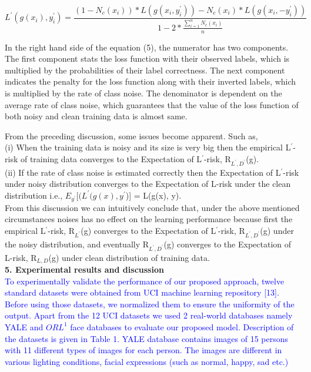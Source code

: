 \documentclass{article}
\begin{document}
		\begin{equation} \label{$eq:(1)$}
			L^{\prime}(g(x_i), y_i^{\prime}) = \frac 
			{ (1 - N_c(x_i)) * L(g(x_i, y_i^{\prime})) - N_c(x_i) * L(g(x_i, -y_i^{\prime})) } 
			{ 1-2 * \frac
				{\sum_{i=1}^{n} N_c(x_i)} 
				{n}
			} 
		\end{equation}

		In the right hand side of the equation (5), the numerator has two components. The first component stats
		the loss function with their observed labels, which is multiplied by the probabilities of their label correctness.
		The next component indicates the penalty for the loss function along with their inverted labels, which is multiplied by the rate of class noise. The denominator is dependent on the average rate of class noise, which guarantees that the value of the loss function of both noisy and clean training data is almost same.
		
		\hspace{0.1em}From the preceding discussion, some issues become apparent. Such as,\\
		
		(i) When the training data is noisy and its size is very big then the empirical L$^{\prime}$-risk of training data
		converges to the Expectation of L$^{\prime}$-risk, R$_{L^{\prime},D^{\prime}}$(g). \\
		
		(ii) If the rate of class noise is estimated correctly then the Expectation of L$^{\prime}$-risk under noisy distribution
		converges to the Expectation of L-risk under the clean distribution i.e., $E_{y^{\prime}} [(L^{\prime}(g(x), y^{\prime}$)] = L(g(x), y).\\
		
		\hspace{0.1em}From this discussion we can intuitively conclude that, under the above mentioned circumstances noises has
		no effect on the learning performance because first the empirical L$^{\prime}$-risk, R$_{L^\prime}$(g) converges to the Expectation
		of L$^{\prime}$-risk, R$_{L^{\prime},D^{\prime}}$(g) under the noisy distribution, and eventually R$_{L^{\prime},D^{\prime}}$(g) converges to the Expectation of L-risk, R$_{L,D}$(g) under clean distribution of training data.\\
		
		
		\textbf{5. Experimental results and discussion}\\
		
		
		\textcolor{blue}{To experimentally validate the performance of our proposed approach, twelve standard datasets were obtained from UCI machine learning repository [13]. Before using those datasets, we normalized them to ensure the uniformity of the output. Apart from the 12 UCI datasets we used 2 real-world databases namely YALE and $ORL^1$ face databases to evaluate our proposed model. Description of the datasets is given in Table 1. YALE database contains images of 15 persons with 11 different types of images for each person. The images are different in various lighting conditions, facial expressions (such as normal, happy, sad etc.)}
		
\end{document}
